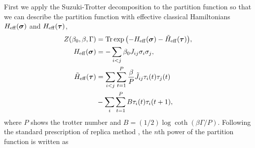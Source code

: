 \documentclass[aps,pra,twocolumn,groupedaddress,longbibliography]{revtex4}
\def\v#1{\mbox{\boldmath $#1$}}
\newcommand{\Sig}{\sigma}
\begin{document}
First we apply the Suzuki-Trotter decomposition \cite{Trotter1959, Suzuki1976} to the partition function so that we can describe the partition function with effective classical Hamiltonians $H_{\mathrm{eff}}(\v{\Sig})$ and $H_{\mathrm{eff}}(\v{\tau})$,
\begin{align}
	Z(\beta_0, \beta, \Gamma) &= \mathrm{Tr} \exp{\left(-H_{\mathrm{eff}}(\v{\Sig})-\tilde{H}_{\mathrm{eff}}(\v{\tau})\right)}, \\
	H_{\mathrm{eff}}(\v{\Sig}) &= -\sum_{i<j}\beta_0 J_{ij}\Sig_i \Sig_j,\\
	\tilde{H}_{\mathrm{eff}}(\v{\tau}) &= \sum_{i<j}\sum_{t=1}^{P}\frac{\beta}{P}\tilde{J}_{ij}\tau_i(t)\tau_j(t) \nonumber \\
	&-\sum_{i}\sum_{t=1}^{P}B\tau_i(t)\tau_i(t+1),
\end{align}
where $P$ shows the trotter number and $B = (1/2)\log{\coth{(\beta \Gamma/P)}}$. Following the standard prescription of replica method \cite{nsmrbook}, the $n$th power of the partition function is written as
\end{document}
